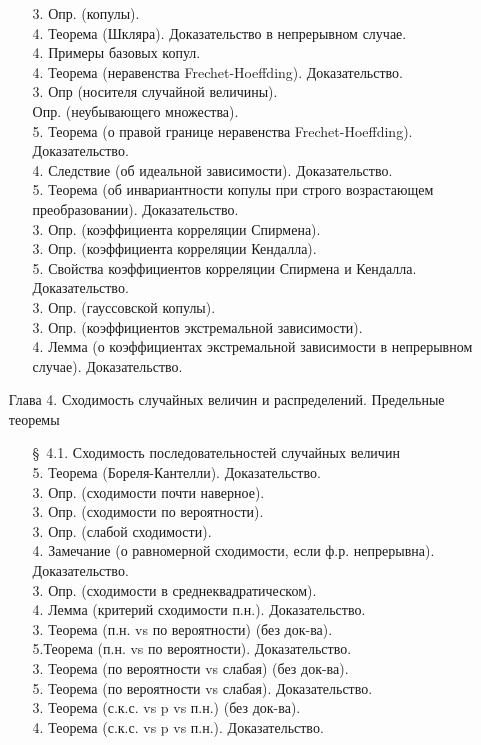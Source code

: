 \documentclass[10pt]{amsart}
\begin{document}
\begin{enumerate}
\begin{enumerate}
3. Опр. (копулы). \\
4. Теорема (Шкляра). Доказательство в непрерывном случае. \\
4. Примеры базовых копул. \\
4. Теорема (неравенства Frechet-Hoeffding). Доказательство. \\
3. Опр (носителя случайной величины). \\
Опр. (неубывающего множества). \\
5. Теорема (о правой границе неравенства Frechet-Hoeffding).  Доказательство. \\
4. Следствие (об идеальной зависимости). Доказательство. \\
5. Теорема (об инвариантности копулы при строго возрастающем преобразовании). Доказательство. \\
3. Опр. (коэффициента корреляции Спирмена). \\
3. Опр. (коэффициента корреляции Кендалла). \\
5. Свойства коэффициентов корреляции Спирмена и Кендалла. Доказательство. \\ 
3. Опр. (гауссовской копулы). \\
3. Опр. (коэффициентов экстремальной зависимости). \\
4. Лемма (о коэффициентах экстремальной зависимости в непрерывном случае). Доказательство. \\
\end{enumerate}
    
    
\item[Глава 4.] Сходимость случайных величин и распределений. Предельные теоремы \\
\begin{enumerate}
\item[\S\, 4.1.] Сходимость последовательностей случайных величин \\
5. Теорема (Бореля-Кантелли). Доказательство. \\
3. Опр. (сходимости почти наверное). \\
3. Опр. (сходимости по вероятности). \\
3. Опр. (слабой сходимости). \\
4. Замечание (о равномерной сходимости, если ф.р. непрерывна). Доказательство. \\
3. Опр. (сходимости в среднеквадратическом). \\
4. Лемма (критерий сходимости п.н.). Доказательство. \\
3. Теорема (п.н. vs по вероятности)  (без док-ва). \\
5.Теорема (п.н. vs по вероятности). Доказательство. \\
3. Теорема (по вероятности vs слабая) (без док-ва). \\  
5. Теорема (по вероятности vs слабая). Доказательство. \\  
3. Теорема (с.к.с. vs p vs п.н.) (без док-ва). \\ 
4. Теорема (с.к.с. vs p vs п.н.). Доказательство. \\ 


\end{enumerate}
\end{enumerate}
\end{document}
